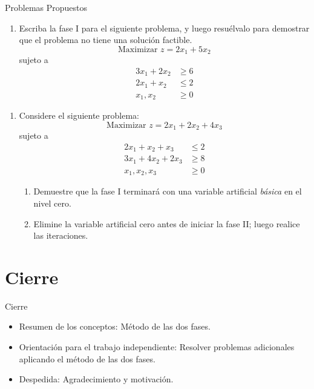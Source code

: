 \documentclass{beamer}
\begin{document}
\begin{frame}{Problemas Propuestos}
    \begin{enumerate}
        \item Escriba la fase I para el siguiente problema, y luego resuélvalo para demostrar que el problema no tiene una solución factible.
        \[
        \text{Maximizar } z = 2x_1 + 5x_2
        \]
        sujeto a
        \[
        \begin{aligned}
        3x_1 + 2x_2 &\geq 6 \\
        2x_1 + x_2 &\leq 2 \\
        x_1, x_2 &\geq 0
        \end{aligned}
        \]
    \end{enumerate}
\end{frame}

\begin{frame}
    \begin{enumerate}
    \item Considere el siguiente problema:
    \[
    \text{Maximizar } z = 2x_1 + 2x_2 + 4x_3
    \]
    sujeto a
    \[
    \begin{aligned}
    2x_1 + x_2 + x_3 &\leq 2 \\
    3x_1 + 4x_2 + 2x_3 &\geq 8 \\
    x_1, x_2, x_3 &\geq 0
    \end{aligned}
    \]
    \begin{enumerate}
        \item Demuestre que la fase I terminará con una variable artificial \emph{básica} en el nivel cero.
        \item Elimine la variable artificial cero antes de iniciar la fase II; luego realice las iteraciones.
    \end{enumerate}
    \end{enumerate}
\end{frame}
\section{Cierre}
\begin{frame}{Cierre}
    \begin{itemize}
        \item Resumen de los conceptos: Método de las dos fases.
        \item Orientación para el trabajo independiente: Resolver problemas adicionales aplicando el método de las dos fases.
        \item Despedida: Agradecimiento y motivación.
    \end{itemize}
\end{frame}
\end{document}
